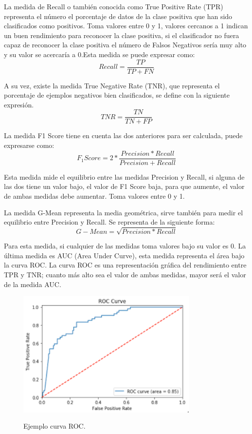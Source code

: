 La medida de Recall o también conocida como True Positive Rate (TPR) representa el número el porcentaje de datos de la clase positiva que han sido clasificados como positivos. Toma valores entre 0 y 1, valores cercanos a 1 indican un buen rendimiento para reconocer la clase positiva, si el clasificador no fuera capaz de reconocer la clase positiva el número de Falsos Negativos sería muy alto y su valor se acercaría a 0.Esta medida se puede expresar como:\newline
$$ Recall = \frac{TP}{TP + FN} $$


A su vez, existe la medida True Negative Rate (TNR), que representa el porcentaje de ejemplos negativos bien clasificados, se define con la siguiente expresión.\newline
$$ TNR = \frac{TN}{TN + FP} $$

La medida F1 Score tiene en cuenta las dos anteriores para ser calculada, puede expresarse como:\newline
$$ F_1 Score = 2 * \frac{Precision*Recall}{Precision+Recall} $$

Esta medida mide el equilibrio entre las medidas Precision y Recall, si alguna de las dos tiene un valor bajo, el valor de F1 Score baja, para que aumente, el valor de ambas medidas debe aumentar. Toma valores entre 0 y 1.\newline

La medida G-Mean representa la media geométrica, sirve también para medir el equilibrio entre Precision y Recall. Se representa de la siguiente forma:\newline
$$ G-Mean = \sqrt{Precision*Recall} $$

Para esta medida, si cualquier de las medidas toma valores bajo su valor es 0.\newline
La última medida es AUC (Area Under Curve), esta medida representa el área bajo la curva ROC. La curva ROC es una representación gráfica del rendimiento entre TPR y TNR; cuanto más alto sea el valor de ambas medidas, mayor será el valor de la medida AUC.\newline

\begin{figure}[h]
	\centering
	\includegraphics[width=90mm]{imagenes/auc.png}
	\label{fig:14}
	\caption{Ejemplo curva ROC.}
\end{figure}
\verticalspace

